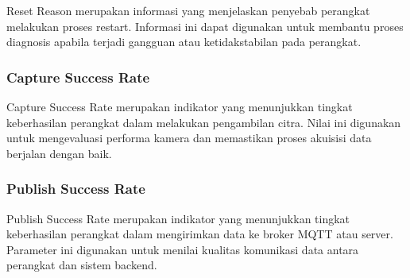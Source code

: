 Reset Reason merupakan informasi yang menjelaskan penyebab perangkat melakukan proses restart. Informasi ini dapat digunakan untuk membantu proses diagnosis apabila terjadi gangguan atau ketidakstabilan pada perangkat.

\subsubsection{Capture Success Rate}

Capture Success Rate merupakan indikator yang menunjukkan tingkat keberhasilan perangkat dalam melakukan pengambilan citra. Nilai ini digunakan untuk mengevaluasi performa kamera dan memastikan proses akuisisi data berjalan dengan baik.

\subsubsection{Publish Success Rate}

Publish Success Rate merupakan indikator yang menunjukkan tingkat keberhasilan perangkat dalam mengirimkan data ke broker MQTT atau server. Parameter ini digunakan untuk menilai kualitas komunikasi data antara perangkat dan sistem backend.
